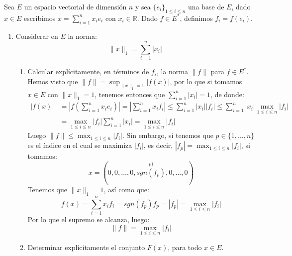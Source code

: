 \begin{ejercicio}
    Sea $E$ un espacio vectorial de dimensión $n$ y sea $\{e_i\}_{1\leq i \leq n}$ una base de $E$, dado $x\in E$ escribimos $x =\sum_{i=1}^{n}x_ie_i$ con $x_i\in \mathbb{R}$. Dado $f\in E^\ast$, definimos $f_i = f(e_i)$.
    \begin{enumerate}[label=\alph*)]
        \item Considerar en $E$ la norma:
            \begin{equation*}
                \|x\|_1 = \sum_{i=1}^{n}|x_i|
            \end{equation*}
            \begin{enumerate}
                \item Calcular explícitamente, en términos de $f_i$, la norma $\|f\|$ para $f\in E^\ast$.\\

                    Hemos visto que $\|f\| = \sup_{\|x\|_1=1}|f(x)|$, por lo que si tomamos $x\in E$ con $\|x\|_1=1$, tenemos entonces que $\sum_{i=1}^{n}|x_i| = 1$, de donde:
                    \begin{align*}
                        |f(x)| &= \left|f\left(\sum_{i=1}^{n}x_ie_i\right)\right| = \left|\sum_{i=1}^{n}x_if_i\right| \leq \sum_{i=1}^{n}|x_i||f_i|  \leq \sum_{i=1}^{n}|x_i|\max_{1\leq i \leq n}|f_i| \\
                               &= \max_{1\leq i\leq n}|f_i| \sum_{i=1}^{n}|x_i| = \max_{1\leq i\leq n}|f_i|
                    \end{align*}
                    Luego $\|f\|\leq \max_{1\leq i\leq n}|f_i|$. Sin embargo, si tenemos que $p\in \{1,\ldots,n\}$ es el índice en el cual se maximiza $|f_i|$, es decir, $|f_p| = \max_{1\leq i\leq n}|f_i|$, si tomamos:
                    \begin{equation*}
                        x = (0,0, \ldots, 0, \stackrel{p)}{sgn(f_p)},0,\ldots, 0)
                    \end{equation*}
                    Tenemos que $\|x\|_1=1$, así como que:
                    \begin{equation*}
                        f(x) = \sum_{i=1}^{n}x_if_i = sgn(f_p)f_p = |f_p| = \max_{1\leq i \leq n}|f_i|
                    \end{equation*}
                    Por lo que el supremo se alcanza, luego:
                    \begin{equation*}
                        \|f\| = \max_{1\leq i \leq n}|f_i|
                    \end{equation*}
                \item Determinar explícitamente el conjunto $F(x)$, para todo $x\in E$.


\end{enumerate}
\end{enumerate}
\end{ejercicio}
